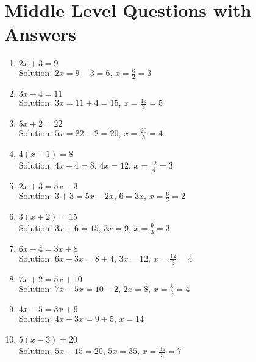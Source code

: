 \documentclass{article}
\begin{document}
\section*{Middle Level Questions with Answers}
\begin{enumerate}
    \item \( 2x + 3 = 9 \) \\
          Solution: \( 2x = 9 - 3 = 6 \), \( x = \frac{6}{2} = 3 \)
    \item \( 3x - 4 = 11 \) \\
          Solution: \( 3x = 11 + 4 = 15 \), \( x = \frac{15}{3} = 5 \)
    \item \( 5x + 2 = 22 \) \\
          Solution: \( 5x = 22 - 2 = 20 \), \( x = \frac{20}{5} = 4 \)
    \item \( 4(x - 1) = 8 \) \\
          Solution: \( 4x - 4 = 8 \), \( 4x = 12 \), \( x = \frac{12}{4} = 3 \)
    \item \( 2x + 3 = 5x - 3 \) \\
          Solution: \( 3 + 3 = 5x - 2x \), \( 6 = 3x \), \( x = \frac{6}{3} = 2 \)
    \item \( 3(x + 2) = 15 \) \\
          Solution: \( 3x + 6 = 15 \), \( 3x = 9 \), \( x = \frac{9}{3} = 3 \)
    \item \( 6x - 4 = 3x + 8 \) \\
          Solution: \( 6x - 3x = 8 + 4 \), \( 3x = 12 \), \( x = \frac{12}{3} = 4 \)
    \item \( 7x + 2 = 5x + 10 \) \\
          Solution: \( 7x - 5x = 10 - 2 \), \( 2x = 8 \), \( x = \frac{8}{2} = 4 \)
    \item \( 4x - 5 = 3x + 9 \) \\
          Solution: \( 4x - 3x = 9 + 5 \), \( x = 14 \)
    \item \( 5(x - 3) = 20 \) \\
          Solution: \( 5x - 15 = 20 \), \( 5x = 35 \), \( x = \frac{35}{5} = 7 \)
\end{enumerate}
\end{document}
